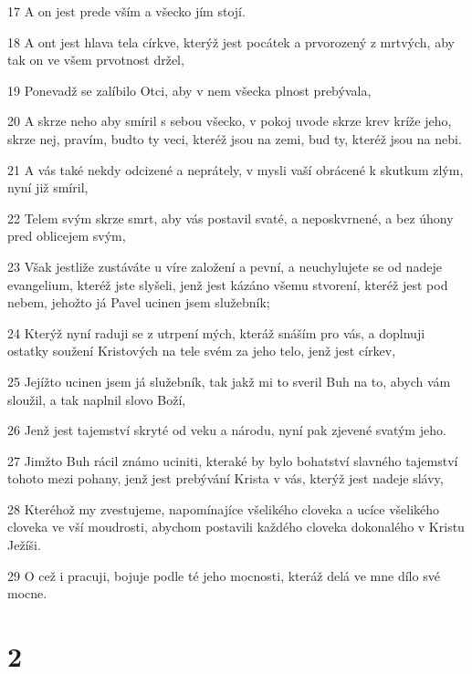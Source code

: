 \par 17 A on jest prede vším a všecko jím stojí.
\par 18 A ont jest hlava tela církve, kterýž jest pocátek a prvorozený z mrtvých, aby tak on ve všem prvotnost držel,
\par 19 Ponevadž se zalíbilo Otci, aby v nem všecka plnost prebývala,
\par 20 A skrze neho aby smíril s sebou všecko, v pokoj uvode skrze krev kríže jeho, skrze nej, pravím, budto ty veci, kteréž jsou na zemi, bud ty, kteréž jsou na nebi.
\par 21 A vás také nekdy odcizené a neprátely, v mysli vaší obrácené k skutkum zlým, nyní již smíril,
\par 22 Telem svým skrze smrt, aby vás postavil svaté, a neposkvrnené, a bez úhony pred oblicejem svým,
\par 23 Však jestliže zustáváte u víre založení a pevní, a neuchylujete se od nadeje evangelium, kteréž jste slyšeli, jenž jest kázáno všemu stvorení, kteréž jest pod nebem, jehožto já Pavel ucinen jsem služebník;
\par 24 Kterýž nyní raduji se z utrpení mých, kteráž snáším pro vás, a doplnuji ostatky soužení Kristových na tele svém za jeho telo, jenž jest církev,
\par 25 Jejížto ucinen jsem já služebník, tak jakž mi to sveril Buh na to, abych vám sloužil, a tak naplnil slovo Boží,
\par 26 Jenž jest tajemství skryté od veku a národu, nyní pak zjevené svatým jeho.
\par 27 Jimžto Buh rácil známo uciniti, kteraké by bylo bohatství slavného tajemství tohoto mezi pohany, jenž jest prebývání Krista v vás, kterýž jest nadeje slávy,
\par 28 Kteréhož my zvestujeme, napomínajíce všelikého cloveka a ucíce všelikého cloveka ve vší moudrosti, abychom postavili každého cloveka dokonalého v Kristu Ježíši.
\par 29 O cež i pracuji, bojuje podle té jeho mocnosti, kteráž delá ve mne dílo své mocne.

\chapter{2}

